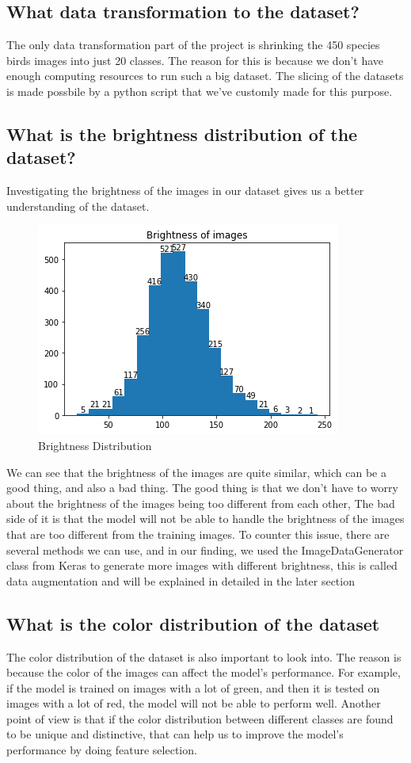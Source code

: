 \subsection{What data transformation to the dataset?}
The only data transformation part of the project is shrinking the 450 species birds images into just 20 classes. The reason for this is because we don't have enough computing resources to run such a big dataset. The slicing of the datasets is made possbile by a python script that we've customly made for this purpose.

\subsection{What is the brightness distribution of the dataset?}
Investigating the brightness of the images in our dataset gives us a better understanding of the dataset. 

\begin{figure}[h]
\centering
\includegraphics[scale=0.70]{color_distri.png}
\caption{Brightness Distribution}
\end{figure}

We can see that the brightness of the images are quite similar, which can be a good thing, and also a bad thing. The good thing is that we don't have to worry about the brightness of the images being too different from each other, The bad side of it is that the model will not be able to handle the brightness of the images that are too different from the training images. To counter this issue, there are several methods we can use, and in our finding, we used the ImageDataGenerator class from Keras to generate more images with different brightness, this is called data augmentation and will be explained in detailed in the later section 

\subsection{What is the color distribution of the dataset}
The color distribution of the dataset is also important to look into. The reason is because the color of the images can affect the model's performance. For example, if the model is trained on images with a lot of green, and then it is tested on images with a lot of red, the model will not be able to perform well. Another point of view is that if the color distribution between different classes are found to be unique and distinctive, that can help us to improve the model's performance by doing feature selection.

